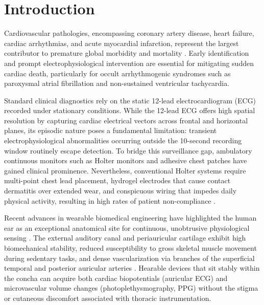 \section{Introduction}
\label{sec:introduction}

Cardiovascular pathologies, encompassing coronary artery disease, heart failure, cardiac arrhythmias, and acute myocardial infarction, represent the largest contributor to premature global morbidity and mortality \cite{Wagner2020}. Early identification and prompt electrophysiological intervention are essential for mitigating sudden cardiac death, particularly for occult arrhythmogenic syndromes such as paroxysmal atrial fibrillation and non-sustained ventricular tachycardia. 

Standard clinical diagnostics rely on the static 12-lead electrocardiogram (ECG) recorded under stationary conditions. While the 12-lead ECG offers high spatial resolution by capturing cardiac electrical vectors across frontal and horizontal planes, its episodic nature poses a fundamental limitation: transient electrophysiological abnormalities occurring outside the 10-second recording window routinely escape detection. To bridge this surveillance gap, ambulatory continuous monitors such as Holter monitors and adhesive chest patches have gained clinical prominence. Nevertheless, conventional Holter systems require multi-point chest lead placement, hydrogel electrodes that cause contact dermatitis over extended wear, and conspicuous wiring that impedes daily physical activity, resulting in high rates of patient non-compliance \cite{Goverdovsky2017}.

Recent advances in wearable biomedical engineering have highlighted the human ear as an exceptional anatomical site for continuous, unobtrusive physiological sensing \cite{vonRosenberg2017}. The external auditory canal and periauricular cartilage exhibit high biomechanical stability, reduced susceptibility to gross skeletal muscle movement during sedentary tasks, and dense vascularization via branches of the superficial temporal and posterior auricular arteries \cite{Allen2007, Celik2017}. Hearable devices that sit stably within the concha can acquire both cardiac biopotentials (auricular ECG) and microvascular volume changes (photoplethysmography, PPG) without the stigma or cutaneous discomfort associated with thoracic instrumentation.

